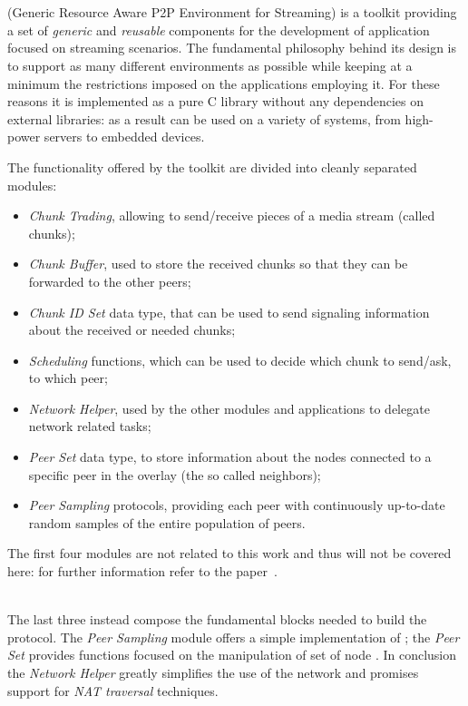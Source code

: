 \chapter{\grapes}
\grapes (Generic Resource Aware P2P Environment for Streaming) is a
toolkit providing a set of \textit{generic} and \textit{reusable}
components for the development of \ptop application focused on
streaming scenarios. The fundamental philosophy behind its design is
to support as many different environments as possible while keeping at
a minimum the restrictions imposed on the applications employing it.
For these reasons it is implemented as a pure C library without any dependencies
on external libraries: as a result \grapes can be used on a variety
of systems, from high-power servers to embedded devices.

The functionality offered by the toolkit are divided into cleanly
separated modules:
\begin{itemize}
  \item \textit{Chunk Trading}, allowing to send/receive pieces of a
    media stream (called chunks);
  \item \textit{Chunk Buffer}, used to store the received chunks so
    that they can be forwarded to the other peers;
  \item \textit{Chunk ID Set} data type, that can be used to send
    signaling information about the received or needed chunks;
   \item \textit{Scheduling} functions, which can be used to decide
     which chunk to send/ask, to which peer;
   \item \textit{Network Helper}, used by the other modules and
     applications to delegate network related tasks;
   \item \textit{Peer Set} data type, to store information about the
     nodes connected to a specific peer in the overlay (the so called
     neighbors);
   \item \textit{Peer Sampling} protocols, providing each peer with
     continuously up-to-date random samples of the entire population
     of peers.
\end{itemize}

The first four modules are not related to this work and thus will not
be covered here: for further information refer to the
\grapes paper~\cite{GRAPES}.

\ \\
The last three instead compose the fundamental blocks needed to build
the \cloudcast \peersampling protocol. The \textit{Peer Sampling} module
offers a simple implementation of \cyclon; the \textit{Peer Set}
provides functions focused on the manipulation of set of node
\descriptors. In conclusion the \textit{Network Helper} greatly
simplifies the use of the network and promises support for
\textit{NAT traversal} techniques.


